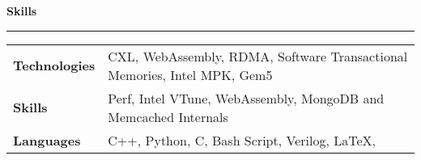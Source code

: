\documentclass{article}
\newlength{\durlen}
\newlength{\deslen}
\newcommand{\sectiontitle}[1]{
  \textbf{\Large{\sffamily #1}}
  \begin{flushright}
      \vspace{-0.48cm} 
      \rule{0.975\textwidth}{1.1pt}
  \end{flushright}
  \vspace{-0.1cm} 
}
\begin{document}

    
        
 
        
    \sectiontitle{\sffamily Skills}
    
    \begin{tabular}{p{\durlen} p{\deslen}}
    \centering \textbf{Technologies} & \hspace{0.5cm}CXL, WebAssembly, RDMA, Software Transactional Memories, Intel MPK, Gem5\\[1mm]
    \centering \textbf{Skills} & \hspace{0.5cm}Perf, Intel VTune, WebAssembly, MongoDB and Memcached Internals\\[1mm]
    \centering \textbf{Languages} & \hspace{0.5cm}C++, Python, C, Bash Script, Verilog, \LaTeX, \\[1mm]
    \end{tabular}
    
    
     
\end{document}
